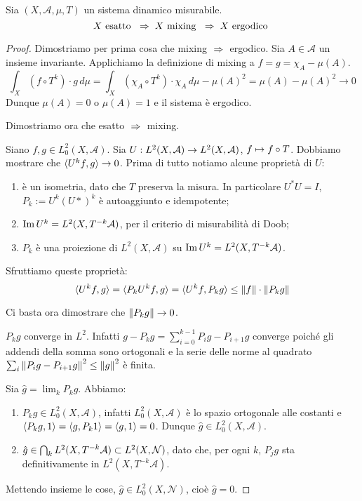 \begin{prop} Sia $(X,\mathcal{A},\mu,T)$ un sistema dinamico misurabile. 
$$X \text{ esatto } \;\Rightarrow \; X \text{ mixing } \;\Rightarrow \; X \text{ ergodico }$$\end{prop}
\begin{proof} Dimostriamo per prima cosa che mixing $\;\Rightarrow \;$ ergodico. Sia $A\in\mathcal{A}$ un insieme invariante. Applichiamo la definizione di mixing a $f=g=\chi_A-\mu(A)$.
$$\int_X \left(f\circ T^k \right) \cdot g \, d\mu=\int_X \left(\chi_A\circ T^k \right) \cdot \chi_A \, d\mu-\mu(A)^2=\mu(A)-\mu(A)^2\rightarrow 0$$
Dunque $\mu(A)=0$ o $\mu(A)=1$ e il sistema \`e ergodico.

Dimostriamo ora che esatto $\;\Rightarrow \;$ mixing.

Siano $f,g\in L^2_0(X,\mathcal{A})$. Sia $U:L^2(X,\mathcal{A})\stackrel{}{\rightarrow} L^2(X,\mathcal{A})$, $f\stackrel{}{\mapsto} f\circ T$. Dobbiamo mostrare che $\langle U^k f, g \rangle\rightarrow 0$. Prima di tutto notiamo alcune propriet\`a di $U$:\begin{enumerate}
\item \`e un isometria, dato che $T$ preserva la misura. In particolare $U^*U=I$, $P_k:=U^k(U*)^k$ \`e autoaggiunto e idempotente;
\item $\mathrm{Im} \, U^k=L^2(X,T^{-k}\mathcal{A})$, per il criterio di misurabilit\`a di Doob;
\item $P_k$ \`e una proiezione di $L^2(X,\mathcal{A})$ su $\mathrm{Im} \, U^k=L^2(X,T^{-k}\mathcal{A})$.
\end{enumerate}

Sfruttiamo queste propriet\`a:
$$\langle U^k f, g \rangle=\langle P_k U^k f, g \rangle=\langle U^k f, P_k g \rangle\leq \left\| f \right\| \cdot\left\| P_k g \right\|$$

Ci basta ora dimostrare che $\left\| P_k g \right\|\rightarrow 0$. 

$P_k g$ converge in $L^2$. Infatti $g-P_k g=\sum_{i=0}^{k-1} P_i g - P_{i+1} g$  converge poich\'e gli addendi della somma sono ortogonali e la serie delle norme al quadrato $\sum_i \left\| P_i g - P_{i+1} g \right\|^2\leq\left\| g \right\|^2$ \`e finita. 

Sia $\hat{g}=\lim_k P_k g$. Abbiamo:\begin{enumerate}
\item $P_k g\in L^2_0(X,\mathcal{A})$, infatti $L^2_0(X,\mathcal{A})$ \`e lo spazio ortogonale alle costanti e $\langle P_k g, 1 \rangle=\langle g, P_k 1 \rangle=\langle g, 1 \rangle=0$. Dunque $\hat{g}\in L^2_0(X,\mathcal{A})$. 
\item $\hat{g}\in \bigcap_k L^2(X,T^{-k}\mathcal{A})\subset L^2(X,\mathcal{N})$, dato che, per ogni $k$,  $P_j g$ sta definitivamente in $L^2(X,T^{-k}\mathcal{A})$.
\end{enumerate}
Mettendo insieme le cose, $\hat{g}\in L^2_0(X,\mathcal{N})$, cio\`e $\hat{g}=0$.
\end{proof}


